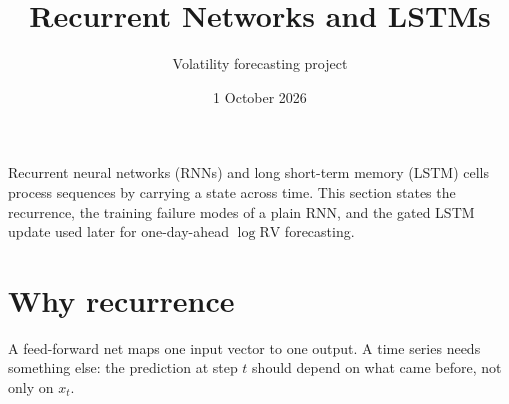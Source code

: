 \documentclass[12pt]{article}
\title{Recurrent Networks and LSTMs}
\author{Volatility forecasting project}
\date{1 October 2026}
\begin{document}
\maketitle

\noindent
Recurrent neural networks (RNNs) and long short-term memory (LSTM) cells process
sequences by carrying a state across time. This section states the recurrence,
the training failure modes of a plain RNN, and the gated LSTM update used later
for one-day-ahead \(\log\mathrm{RV}\) forecasting.

\section{Why recurrence}
A feed-forward net maps one input vector to one output.
A time series needs something else: the prediction at step \(t\) should depend on
what came before, not only on \(x_t\).
\end{document}
